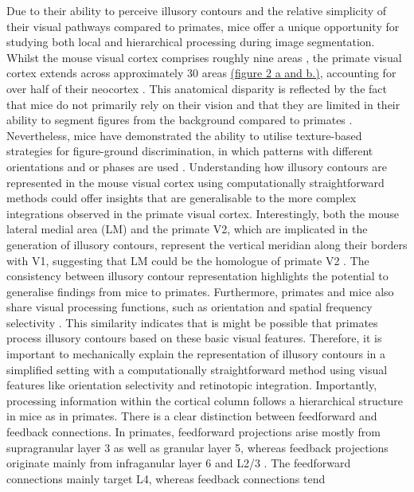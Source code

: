 \documentclass[12pt]{article}
\begin{document}

\bigbreak
Due to their ability to perceive illusory contours and the relative simplicity of their visual pathways compared to primates, mice offer a unique opportunity for studying both local and hierarchical processing during image segmentation. Whilst the mouse visual cortex comprises roughly nine areas \autocite{wangAreaMapMouse2007}, the primate visual cortex extends across approximately 30 areas \hyperref[fig:Laminar_Figure]{(figure 2 a and b.)}, accounting for over half of their neocortex \autocite{fellemanDistributedHierarchicalProcessing1991}. This anatomical disparity is reflected by the fact that mice do not primarily rely on their vision and that they are limited in their ability to segment figures from the background compared to primates \autocite{luongoMicePrimatesUse2023}. Nevertheless, mice have demonstrated the ability to utilise texture-based strategies for figure-ground discrimination, in which patterns with different orientations and or phases are used \autocite{kirchbergerEssentialRoleFeedback2020}. Understanding how illusory contours are represented in the mouse visual cortex using computationally straightforward methods could offer insights that are generalisable to the more complex integrations observed in the primate visual cortex. Interestingly, both the mouse lateral medial area (LM) and the primate V2, which are implicated in the generation of illusory contours, represent the vertical meridian along their borders with V1, suggesting that LM could be the homologue of primate V2 \autocite{gamanutAnatomicalFunctionalConnectomes2022}. The consistency between illusory contour representation highlights the potential to generalise findings from mice to primates. Furthermore, primates and mice also share visual processing functions, such as orientation and spatial frequency selectivity \autocite{niellHighlySelectiveReceptive2008}. This similarity indicates that is might be possible that primates process illusory contours based on these basic visual features. Therefore, it is important to mechanically explain the representation of illusory contours in a simplified setting with a computationally straightforward method using visual features like orientation selectivity and retinotopic integration. Importantly, processing information within the cortical column follows a hierarchical structure in mice as in primates. There is a clear distinction between feedforward and feedback connections. In primates, feedforward projections arise mostly from supragranular layer 3 as well as granular layer 5, whereas feedback projections originate mainly from infraganular layer 6 and L2/3 \autocite{markovAnatomyHierarchyFeedforward2014}. The feedforward connections mainly target L4, whereas feedback connections tend 
\end{document}
